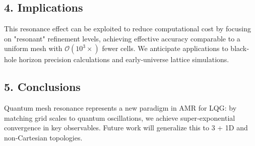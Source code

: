 \documentclass[12pt]{article}
\begin{document}
\subsection*{4. Implications}
This resonance effect can be exploited to reduce computational cost by focusing on "resonant" refinement levels, achieving effective accuracy comparable to a uniform mesh with $\mathcal{O}(10^3\times)$ fewer cells.  We anticipate applications to black‐hole horizon precision calculations and early‐universe lattice simulations.

\subsection*{5. Conclusions}
Quantum mesh resonance represents a new paradigm in AMR for LQG: by matching grid scales to quantum oscillations, we achieve super‐exponential convergence in key observables.  Future work will generalize this to 3 + 1D and non‐Cartesian topologies.
\end{document}
